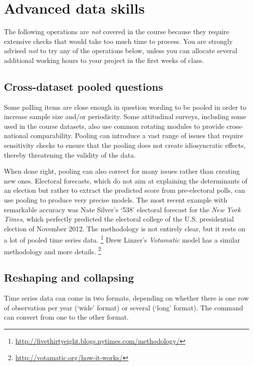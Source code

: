 %
%
\section{Advanced data skills}

The following operations are \emph{not} covered in the course because they require extensive checks that would take too much time to process. You are strongly advised \emph{not} to try any of the operations below, unless you can allocate several additional working hours to your project in the first weeks of class.

%
\subsection{Cross-dataset pooled questions}

Some polling items are close enough in question wording to be pooled in order to increase sample size and/or periodicity. Some attitudinal surveys, including some used in the course datasets, also use common rotating modules to provide cross-national comparability. Pooling can introduce a vast range of issues that require sensitivity checks to ensure that the pooling does not create idiosyncratic effects, thereby threatening the validity of the data.

When done right, pooling can also correct for many issues rather than creating new ones. Electoral forecasts, which do not aim at explaining the determinants of an election but rather to extract the predicted score from pre-electoral polls, can use pooling to produce very precise models. The most recent example with remarkable accuracy was Nate Silver's `538' electoral forecast for the \emph{New York Times}, which perfectly predicted the electoral college of the U.S. presidential election of November 2012. The methodology is not entirely clear, but it rests on a lot of pooled time series data.%
\footnote{\url{http://fivethirtyeight.blogs.nytimes.com/methodology/}} %
Drew Linzer's \emph{Votamatic} model has a similar methodology and more details.%
\footnote{\url{http://votamatic.org/how-it-works/}}

%
\subsection{Reshaping and collapsing}

Time series data can come in two formats, depending on whether there is one row of observation per year (`wide' format) or several (`long' format). The  command can convert from one to the other format.
    
